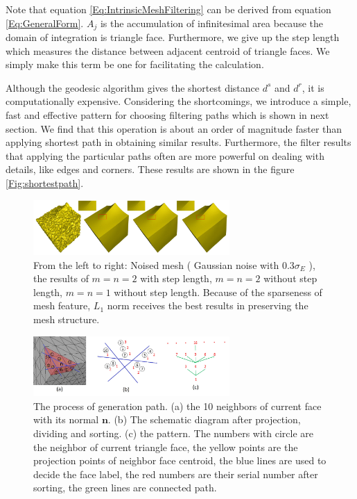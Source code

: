 Note that equation \ref{Eq:IntrinsicMeshFiltering} can be derived from equation \ref{Eq:GeneralForm}.
$A_j$ is the accumulation of infinitesimal area because the domain of integration is triangle face.
Furthermore, we give up the step length which measures the distance between adjacent centroid of triangle faces. %
We simply make this term be one for facilitating the calculation.

Although the geodesic algorithm gives the shortest distance $d^s$ and $d^r$, it is computationally expensive.
Considering the shortcomings, we introduce a simple, fast and effective pattern for choosing filtering paths which is shown in next section.
We find that this operation is about an order of magnitude faster than applying shortest path in obtaining similar results.
Furthermore, the filter results that applying the particular paths often are more powerful on dealing with details, like edges and corners.
These results are shown in the figure \ref{Fig:shortestpath}.

\begin{figure}%
\centering
\includegraphics[width = 7.5cm]{results/Norm/norm.jpg}
\vspace{0.5mm}
\caption{ From the left to right: Noised mesh ( Gaussian noise with 0.3$\sigma_E$ ), the results of $m = n = 2$ with step length,
$m = n = 2$ without step length, $m = n = 1$ without step length.
Because of the sparseness of mesh feature, $L_1$ norm receives the best results in preserving the mesh structure.}
\label{Fig:norm}
\end{figure}

\begin{figure}
\centering
\includegraphics[width = 7.5cm]{results/Path/path1.jpg}
\vspace{-3mm}
\caption{ The process of generation path. (a) the 10 neighbors of current face with its normal $\mathbf{n}$. (b) The schematic diagram after projection, dividing and sorting. (c) the pattern.
The numbers with circle are the neighbor of current triangle face, the yellow points are the projection points of neighbor face centroid, the blue lines are used to decide the face label, the red numbers are their serial number after sorting, the green lines are connected path.}
\label{Fig:path}
\end{figure}

